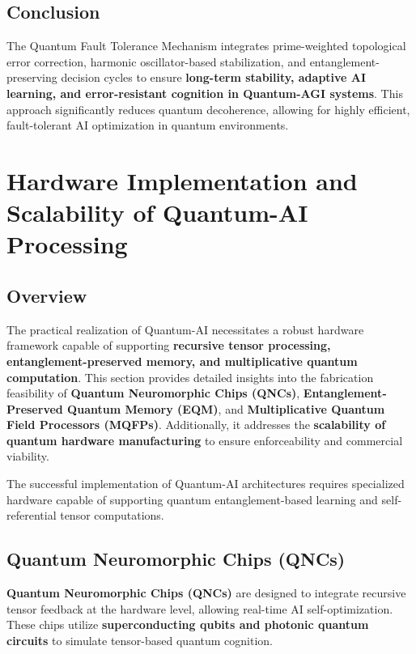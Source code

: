 \documentclass{article}
\theoremstyle{plain}
\begin{document}
\subsection{Conclusion}

The Quantum Fault Tolerance Mechanism integrates prime-weighted topological error correction, harmonic oscillator-based stabilization, and entanglement-preserving decision cycles to ensure \textbf{long-term stability, adaptive AI learning, and error-resistant cognition in Quantum-AGI systems}. This approach significantly reduces quantum decoherence, allowing for highly efficient, fault-tolerant AI optimization in quantum environments.

\section{Hardware Implementation and Scalability of Quantum-AI Processing}

\subsection{Overview}

The practical realization of Quantum-AI necessitates a robust hardware framework capable of supporting \textbf{recursive tensor processing, entanglement-preserved memory, and multiplicative quantum computation}. This section provides detailed insights into the fabrication feasibility of \textbf{Quantum Neuromorphic Chips (QNCs)}, \textbf{Entanglement-Preserved Quantum Memory (EQM)}, and \textbf{Multiplicative Quantum Field Processors (MQFPs)}. Additionally, it addresses the \textbf{scalability of quantum hardware manufacturing} to ensure enforceability and commercial viability.

The successful implementation of Quantum-AI architectures requires specialized hardware capable of supporting quantum entanglement-based learning and self-referential tensor computations.

\subsection{Quantum Neuromorphic Chips (QNCs)}

\textbf{Quantum Neuromorphic Chips (QNCs)} are designed to integrate recursive tensor feedback at the hardware level, allowing real-time AI self-optimization. These chips utilize \textbf{superconducting qubits and photonic quantum circuits} to simulate tensor-based quantum cognition.
\end{document}
